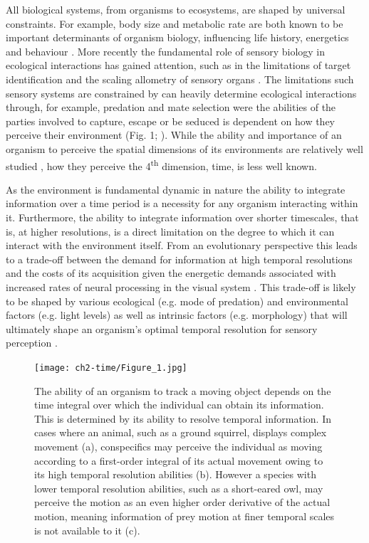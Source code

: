 All biological systems, from organisms to ecosystems, are shaped by universal constraints. For example, body size and metabolic rate are both known to be important determinants of organism biology, influencing life history, energetics and behaviour \citep{brown2004, woodward2005, sibly2012metabolic}. More recently the fundamental role of sensory biology in ecological interactions has gained attention, such as in the limitations of target identification \citep{tosh2010modelling} and the scaling allometry of sensory organs \citep{howland2004allometry,cronin2005role,garamszegi2002coevolving}. The limitations such sensory systems are constrained by can heavily determine ecological interactions through, for example, predation and mate selection were the abilities of the parties involved to capture, escape or be seduced is dependent on how they perceive their environment (Fig. 1; \citealt{cronin2005role,clark2012field,hornstein2000sexual,stevens2007predator}). While the ability and importance of an organism to perceive the spatial dimensions of its environments are relatively well studied \citep{cronin2005role,clark2012field}, how they perceive the 4\textsuperscript{th} dimension, time, is less well known.

As the environment is fundamental dynamic in nature the ability to integrate information over a time period is a necessity for any organism interacting within it. Furthermore, the ability to integrate information over shorter timescales, that is, at higher resolutions, is a direct limitation on the degree to which it can interact with the environment itself. From an evolutionary perspective this leads to a trade-off between the demand for information at high temporal resolutions and the costs of its acquisition given the energetic demands associated with increased rates of neural processing in the visual system \citep{laughlin2001energy}. This trade-off is likely to be shaped by various ecological (e.g. mode of predation) and environmental factors (e.g. light levels) as well as intrinsic factors (e.g. morphology) that will ultimately shape an organism's optimal temporal resolution for sensory perception \citep{autrum1958electrophysiological}.


\begin{figure}[h]
  \centering
  \texttt{[image: ch2-time/Figure\_1.jpg]}%
  \caption[Figure 1.]{ The ability of an organism to track a moving object depends on the time integral over which the individual can obtain its information. This is determined by its ability to resolve temporal information. In cases where an animal, such as a ground squirrel, displays complex movement (a), conspecifics may perceive the individual as moving according to a first-order integral of its actual movement owing to its high temporal resolution abilities (b). However a species with lower temporal resolution abilities, such as a short-eared owl, may perceive the motion as an even higher order derivative of the actual motion, meaning information of prey motion at finer temporal scales is not available to it (c).}
  \label{fig:Figure 1.}
\end{figure}


